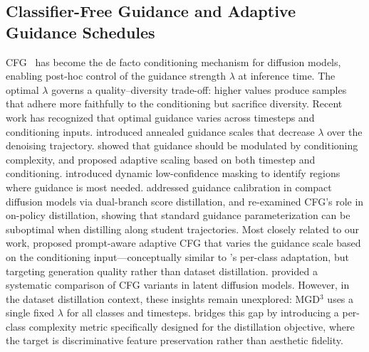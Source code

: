 \subsection{Classifier-Free Guidance and Adaptive Guidance Schedules}
CFG~\cite{ho2022classifierfree} has become the de facto conditioning mechanism for diffusion models, enabling post-hoc control of the guidance strength $\lambda$ at inference time. The optimal $\lambda$ governs a quality--diversity trade-off: higher values produce samples that adhere more faithfully to the conditioning but sacrifice diversity. Recent work has recognized that optimal guidance varies across timesteps and conditioning inputs. \citet{yehezkel2025navigating} introduced annealed guidance scales that decrease $\lambda$ over the denoising trajectory. \citet{zhang2025much} showed that guidance should be modulated by conditioning complexity, and \citet{malarz2025classifierfree} proposed adaptive scaling based on both timestep and conditioning. \citet{li2025adaptive} introduced dynamic low-confidence masking to identify regions where guidance is most needed. \citet{shafi2026dash} addressed guidance calibration in compact diffusion models via dual-branch score distillation, and \citet{li2026rethinking} re-examined CFG's role in on-policy distillation, showing that standard guidance parameterization can be suboptimal when distilling along student trajectories. Most closely related to our work, \citet{zhang2025promptaware} proposed prompt-aware adaptive CFG that varies the guidance scale based on the conditioning input---conceptually similar to \cags{}'s per-class adaptation, but targeting generation quality rather than dataset distillation. \citet{sergievskii2026revisiting} provided a systematic comparison of CFG variants in latent diffusion models. However, in the dataset distillation context, these insights remain unexplored: MGD$^3$ uses a single fixed $\lambda$ for all classes and timesteps. \ags{} bridges this gap by introducing a per-class complexity metric specifically designed for the distillation objective, where the target is discriminative feature preservation rather than aesthetic fidelity.
